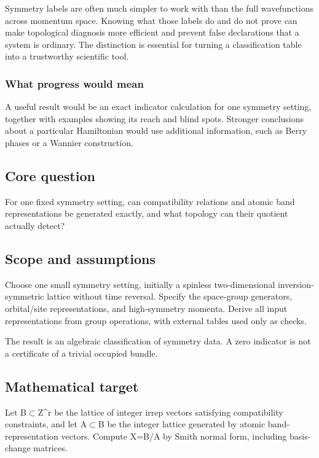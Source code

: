 \documentclass[
  11pt,
]{article}
\begin{document}
Symmetry labels are often much simpler to work with than the full
wavefunctions across momentum space. Knowing what those labels do and do
not prove can make topological diagnosis more efficient and prevent
false declarations that a system is ordinary. The distinction is
essential for turning a classification table into a trustworthy
scientific tool.

\subsubsection{What progress would mean}

A useful result would be an exact indicator calculation for one symmetry
setting, together with examples showing its reach and blind spots.
Stronger conclusions about a particular Hamiltonian would use additional
information, such as Berry phases or a Wannier construction.

\subsection{Core question}

For one fixed symmetry setting, can compatibility relations and atomic
band representations be generated exactly, and what topology can their
quotient actually detect?

\subsection{Scope and assumptions}

Choose one small symmetry setting, initially a spinless two-dimensional
inversion-symmetric lattice without time reversal. Specify the
space-group generators, orbital/site representations, and high-symmetry
momenta. Derive all input representations from group operations, with
external tables used only as checks.

The result is an algebraic classification of symmetry data. A zero
indicator is not a certificate of a trivial occupied bundle.

\subsection{Mathematical target}

Let B\ensuremath{\subset}Z\textasciicircum{}r be the lattice of integer
irrep vectors satisfying compatibility constraints, and let
A\ensuremath{\subset}B be the integer lattice generated by atomic
band-representation vectors. Compute X=B/A by Smith normal form,
including basis-change matrices.
\end{document}
